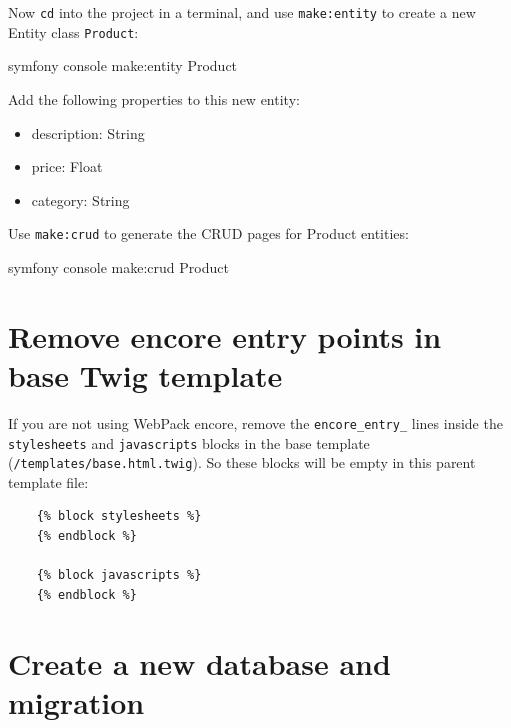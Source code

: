 \documentclass[a4paperpaper,openright]{book}
\newenvironment{Shaded}{}{}
\newcommand{\ExtensionTok}[1]{#1}
\newcommand{\NormalTok}[1]{#1}
\providecommand{\tightlist}{%
  \setlength{\itemsep}{0pt}\setlength{\parskip}{0pt}}
\begin{document}
Now \texttt{cd} into the project in a terminal, and use
\texttt{make:entity} to create a new Entity class \texttt{Product}:

\begin{Shaded}
\begin{Highlighting}[]
     \ExtensionTok{symfony}\NormalTok{ console make:entity Product}
\end{Highlighting}
\end{Shaded}

Add the following properties to this new entity:

\begin{itemize}
\tightlist
\item
  description: String
\item
  price: Float
\item
  category: String
\end{itemize}

Use \texttt{make:crud} to generate the CRUD pages for Product entities:

\begin{Shaded}
\begin{Highlighting}[]
     \ExtensionTok{symfony}\NormalTok{ console make:crud Product}
\end{Highlighting}
\end{Shaded}

\hypertarget{remove-encore-entry-points-in-base-twig-template-1}{%
\section{Remove encore entry points in base Twig
template}\label{remove-encore-entry-points-in-base-twig-template-1}}

If you are not using WebPack encore, remove the \texttt{encore\_entry\_}
lines inside the \texttt{stylesheets} and \texttt{javascripts} blocks in
the base template (\texttt{/templates/base.html.twig}). So these blocks
will be empty in this parent template file:

\begin{verbatim}
    {% block stylesheets %}
    {% endblock %}

    {% block javascripts %}
    {% endblock %}
\end{verbatim}

\hypertarget{create-a-new-database-and-migration-1}{%
\section{Create a new database and
migration}\label{create-a-new-database-and-migration-1}}
\end{document}
